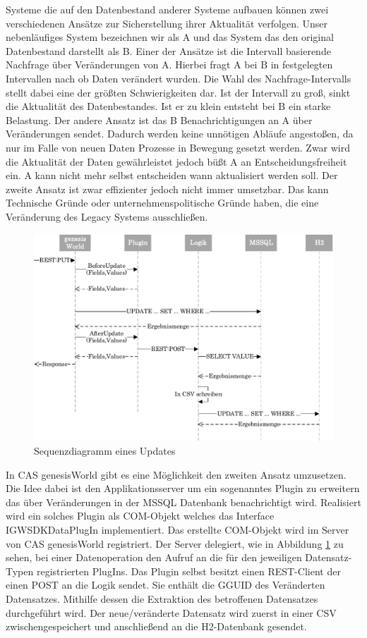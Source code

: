 Systeme die auf den Datenbestand anderer Systeme aufbauen können zwei verschiedenen Ansätze zur Sicherstellung ihrer Aktualität verfolgen. Unser nebenläufiges System bezeichnen wir als A und das System das den original Datenbestand darstellt als B. Einer der Ansätze ist die Intervall basierende Nachfrage über Veränderungen von A. Hierbei fragt A bei B in festgelegten Intervallen nach ob Daten verändert wurden. Die Wahl des Nachfrage-Intervalls stellt dabei eine der größten Schwierigkeiten dar. Ist der Intervall zu groß, sinkt die Aktualität des Datenbestandes. Ist er zu klein entsteht bei B ein starke Belastung. Der andere Ansatz ist das B Benachrichtigungen an A über Veränderungen sendet. Dadurch werden keine unnötigen Abläufe angestoßen, da nur im Falle von neuen Daten Prozesse in Bewegung gesetzt werden. Zwar wird die Aktualität der Daten gewährleistet jedoch büßt A an Entscheidungsfreiheit ein. A kann nicht mehr selbst entscheiden wann aktualisiert werden soll. Der zweite Ansatz ist zwar effizienter jedoch nicht immer umsetzbar. Das kann Technische Gründe oder unternehmenspolitische Gründe haben, die eine Veränderung des Legacy Systems ausschließen.  

\begin{figure}[htbp]
\centering
  \includegraphics[width=1.0\textwidth, width=1.0\textwidth]{pics/sequenzdiagramm.pdf}
\caption{Sequenzdiagramm eines Updates}
\label{konzept_sequenz}
\end{figure}

In CAS genesisWorld gibt es eine Möglichkeit den zweiten Ansatz umzusetzen. Die Idee dabei ist den Applikationsserver um ein sogenanntes Plugin zu erweitern das über Veränderungen in der MSSQL Datenbank benachrichtigt wird. Realisiert wird ein solches Plugin als COM-Objekt welches das Interface IGWSDKDataPlugIn implementiert. Das erstellte COM-Objekt wird im Server von CAS genesisWorld registriert. Der Server delegiert, wie in Abbildung \ref{konzept_sequenz} zu sehen, bei einer Datenoperation den Aufruf an die für den jeweiligen Datensatz-Typen registrierten PlugIns. Das Plugin selbst besitzt einen REST-Client der einen POST an die Logik sendet. Sie enthält die GGUID des Veränderten Datensatzes. Mithilfe dessen die Extraktion des betroffenen Datensatzes durchgeführt wird. Der neue/veränderte Datensatz wird zuerst in einer CSV zwischengespeichert und anschließend an die H2-Datenbank gesendet.


